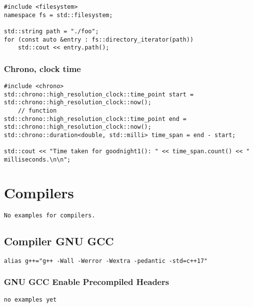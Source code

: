 \begin{verbatim}
#include <filesystem>
namespace fs = std::filesystem;

std::string path = "./foo";
for (const auto &entry : fs::directory_iterator(path))
    std::cout << entry.path();
\end{verbatim}

\subsection{Chrono, clock time}

\begin{verbatim}
#include <chrono>
std::chrono::high_resolution_clock::time_point start = std::chrono::high_resolution_clock::now();
    // function
std::chrono::high_resolution_clock::time_point end = std::chrono::high_resolution_clock::now();
std::chrono::duration<double, std::milli> time_span = end - start;

std::cout << "Time taken for goodnight1(): " << time_span.count() << " milliseconds.\n\n";
\end{verbatim}

\chapter{Compilers}
\begin{verbatim}
No examples for compilers.
\end{verbatim}

\section{Compiler GNU GCC}

\begin{verbatim}
alias g++="g++ -Wall -Werror -Wextra -pedantic -std=c++17"
\end{verbatim}

\subsection{GNU GCC Enable Precompiled Headers}

\begin{verbatim}
no examples yet
\end{verbatim}

